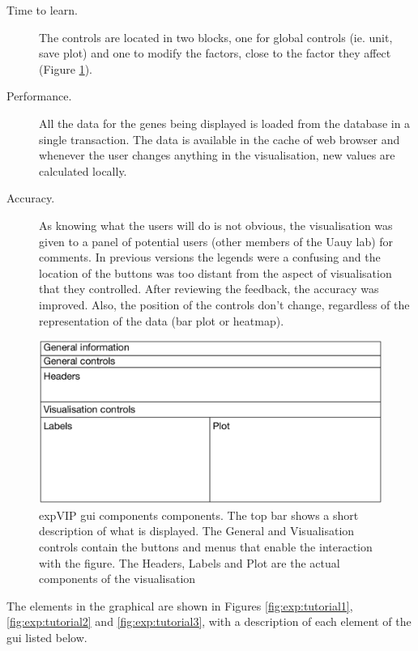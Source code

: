 \begin{description}
\item[Time to learn.] The controls are located in two blocks, one for global controls (ie. unit, save plot) and one to modify the factors, close to the factor they affect (Figure \ref{fig:exp:layout}). 
\item[Performance.] All the data for the genes being displayed is loaded from the database in a single transaction. The data is available in the cache of web browser and whenever the user changes anything in the visualisation, new values are calculated locally. 
\item[Accuracy.] As knowing what the users will do is not obvious, the visualisation was given to a panel of potential users (other members of the Uauy lab) for comments. In previous versions the legends were a confusing and the location of the buttons was too distant from the aspect of visualisation that they controlled. After reviewing the feedback, the accuracy was improved.  Also, the position of the controls don't change, regardless of the representation of the data (bar plot or heatmap). 
\end{description}

\begin{figure}
\includegraphics[width=1\textwidth]{expVIP/Figures/UIsketch.pdf}
\caption[expVIP \acrshort{gui} layout]{expVIP \acrlong{gui} components components. The top bar shows a short description of what is displayed. The General and Visualisation controls contain the buttons and menus that enable the interaction with the figure. The Headers, Labels and Plot are the actual components of the visualisation}
\label{fig:exp:layout}
\end{figure}

The elements in the graphical are shown in Figures \ref{fig:exp:tutorial1}, \ref{fig:exp:tutorial2} and \ref{fig:exp:tutorial3}, with a description of each element of the \acrshort{gui} listed below. 

